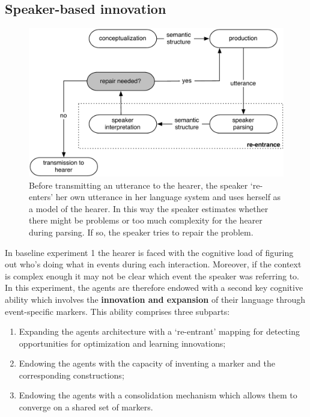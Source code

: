 \subsection{Speaker-based innovation}

\begin{figure}[t]
\centerline{\includegraphics[width=\linewidth]{Chapter3/figs/re-entrance}}
  \caption[Speaker re-entrance]{Before transmitting an utterance to the hearer, the speaker `re-enters' her own utterance in her language system and uses herself as a model of the hearer. In this way the speaker estimates whether there might be problems or too much complexity for the hearer during parsing. If so, the speaker tries to repair the problem.}
   \label{f:re-entrance}
\end{figure}

In baseline experiment 1 the hearer is faced with the cognitive load of figuring out who's doing what in events during each interaction. Moreover, if the context is complex enough it may not be clear which event the speaker was referring to. In this experiment, the agents are therefore endowed with a second key cognitive ability which involves the {\bfseries innovation and expansion} of their language through event-specific markers. This ability comprises three subparts:

\begin{enumerate}
\item Expanding the agents architecture with a `re-entrant' mapping for detecting opportunities for optimization and learning innovations;
\item Endowing the agents with the capacity of inventing a marker and the corresponding constructions;
\item Endowing the agents with a consolidation mechanism which allows them to converge on a shared set of markers.  
\end{enumerate}

